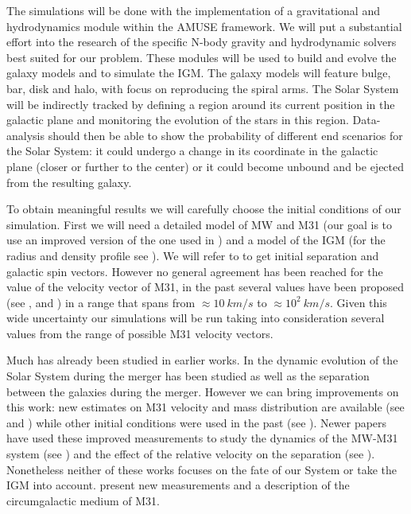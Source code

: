 \documentclass[10pt,english]{article}
\begin{document}
The simulations will be done with the implementation of a gravitational and hydrodynamics module within the AMUSE framework. We will put a substantial effort into the research of the specific N-body gravity and hydrodynamic solvers best suited for our problem. These modules will be used to build and evolve the galaxy models and to simulate the IGM. The galaxy models will feature bulge, bar, disk and halo, with focus on reproducing the spiral arms. The Solar System will be indirectly tracked by defining a region around its current position in the galactic plane and monitoring the evolution of the stars in this region. Data-analysis should then be able to show the probability of different end scenarios for the Solar System: it could undergo a change in its coordinate in the galactic plane (closer or further to the center) or it could become unbound and be ejected from the resulting galaxy.\par
\smallskip
To obtain meaningful results we will carefully choose the initial conditions of our simulation. First we will need a detailed model of MW and M31 (our goal is to use an improved version of the one used in \textcite{Cox_2008}) and a model of the IGM (for the radius and density profile see \textcite{Lehner_2020}). We will refer to \textcite{Raychaudhury_1989} to get initial separation and galactic spin vectors. However no general agreement has been reached for the value of the velocity vector of M31, in the past several values have been proposed (see \textcite{van_der_Marel_2012b}, \textcite{Salomon_2016} and \textcite{van_der_Marel_2019}) in a range that spans from \(\approx 10\: km/s\) to \(\approx 10^2\: km/s\). Given this wide uncertainty our simulations will be run taking into consideration several values from the range of possible M31 velocity vectors.\par
\smallskip
Much has already been studied in earlier works. In \textcite{Cox_2008} the dynamic evolution of the Solar System during the merger has been studied as well as the separation between the galaxies during the merger. However we can bring improvements on this work: new estimates on M31 velocity and mass distribution are available (see \textcite{Sohn_2012} and \textcite{van_der_Marel_2012}) while other initial conditions were used in the past (see \textcite{Klypin_2002}). Newer papers have used these improved measurements to study the dynamics of the MW-M31 system (see \textcite{van_der_Marel_2012b}) and the effect of the relative velocity on the separation (see \textcite{Schiavi_2019}). Nonetheless neither of these works focuses on the fate of our System or take the IGM into account. \textcite{Lehner_2020} present new measurements and a description of the circumgalactic medium of M31.\par
\end{document}
